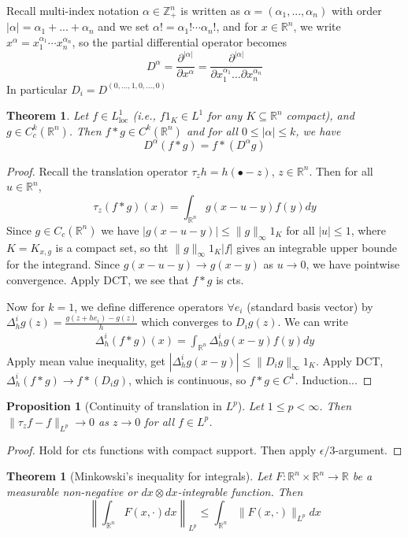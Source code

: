\documentclass{article}
\theoremstyle{definition}
\theoremstyle{remark}
\theoremstyle{plain}
\newtheorem{thm}[defn]{Theorem}
\newtheorem{prop}[defn]{Proposition}
\newcommand{\ZZ}{\mathbb{Z}}
\newcommand{\RR}{\mathbb{R}}
\begin{document}
Recall multi-index notation $\alpha\in\ZZ_+^n$ is written as $\alpha=(\alpha_1,...,\alpha_n)$ with order $|\alpha|=\alpha_1+...+\alpha_n$ and we set $\alpha!=\alpha_1!\cdots\alpha_n!$, and for $x\in\RR^n$, we write $x^\alpha=x_1^{\alpha_1}\cdots x_n^{\alpha_n}$, so the partial differential operator becomes
\[D^\alpha=\dfrac{\partial^{|\alpha|}}{\partial x^\alpha}=\dfrac{\partial^{|\alpha|}}{\partial x_1^{\alpha_1}...\partial x_n^{\alpha_n}}\]
In particular $D_i=D^{(0,...,1,0,...,0)}$
\begin{thm}
    Let $f\in L^1_{\text{loc}}$ (i.e., $f1_K\in L^1$ for any $K\subseteq\RR^n$ compact), and $g\in C^k_c(\RR^n)$. Then $f\ast g\in C^k(\RR^n)$ and for all $0\le|\alpha|\le k$, we have
    \[D^\alpha(f\ast g)=f\ast(D^\alpha g)\]
\end{thm}
\begin{proof}
    Recall the translation operator $\tau_zh=h(\bullet-z)$, $z\in\RR^n$. Then for all $u\in\RR^n$,
    \[\tau_z(f\ast g)(x)=\int_{\RR^n}g(x-u-y)f(y)dy\]
    Since $g\in C_c(\RR^n)$ we have $|g(x-u-y)|\le\|g\|_\infty1_K$ for all $|u|\le 1$, where $K=K_{x,g}$ is a compact set, so tht $\|g\|_\infty1_K|f|$ gives an integrable upper bounde for the integrand. Since $g(x-u-y)\to g(x-y)$ as $u\to 0$, we have pointwise convergence. Apply DCT, we see that $f\ast g$ is cts.

    Now for $k=1$, we define difference operators $\forall e_i$ (standard basis vector) by $\Delta^i_hg(z)=\frac{g(z+he_i)-g(z)}{h}$ which converges to $D_ig(z)$. We can write
    \begin{align*}
        \Delta_h^i(f\ast g)(x)=\int_{\RR^n}\Delta_h^ig(x-y)f(y)dy
    \end{align*}
    Apply mean value inequality, get $|\Delta_h^ig(x-y)|\le\|D_ig\|_\infty1_K$. Apply DCT, $\Delta_h^i(f\ast g)\to f\ast(D_ig)$, which is continuous, so $f\ast g\in C^1$. Induction...
\end{proof}
\begin{prop}[Continuity of translation in $L^p$]
    Let $1\le p<\infty$. Then $\|\tau_zf-f\|_{L^p}\to 0$ as $z\to 0$ for all $f\in L^p$.
\end{prop}
\begin{proof}
    Hold for cts functions with compact support. Then apply $\epsilon/3$-argument.
\end{proof}
\begin{thm}[Minkowski's inequality for integrals]
    Let $F:\RR^n\times\RR^n\to\RR$ be a measurable non-negative or $dx\otimes dx$-integrable function. Then
    \[\left\|\int_{\RR^n}F(x,\cdot)dx\right\|_{L^p}\le\int_{\RR^n}\|F(x,\cdot)\|_{L^p}dx\]
\end{thm}
\end{document}
